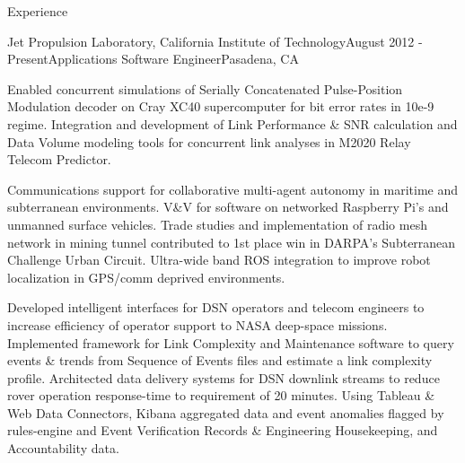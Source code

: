 \documentclass{resume} %
\begin{document}





\begin{rSection}{Experience}
\begin{rSubsection}{Jet Propulsion Laboratory, California Institute of Technology}{August 2012 - Present}{Applications Software Engineer}{Pasadena, CA}
\item Enabled concurrent simulations of Serially Concatenated Pulse-Position Modulation decoder on Cray XC40 supercomputer for bit error rates in 10e-9 regime. Integration and development of Link Performance \& SNR calculation and Data Volume modeling tools for concurrent link analyses in M2020 Relay Telecom Predictor.

\item Communications support for collaborative multi-agent autonomy in maritime and subterranean environments. V\&V for  software on networked Raspberry Pi's and unmanned surface vehicles.  Trade studies and implementation of radio mesh network in mining tunnel contributed to 1st place win in DARPA's Subterranean Challenge Urban Circuit. Ultra-wide band ROS integration to improve robot localization in GPS/comm deprived environments.

\item Developed intelligent interfaces for DSN operators and telecom engineers to increase efficiency of operator support to NASA deep-space missions. Implemented framework for Link Complexity and Maintenance software to query events \& trends from Sequence of Events files and estimate a link complexity profile. Architected data delivery systems for DSN downlink streams to reduce rover operation response-time to requirement of 20 minutes. Using Tableau \& Web Data Connectors, Kibana aggregated data and event anomalies flagged by rules-engine and Event Verification Records \& Engineering Housekeeping, and Accountability data. 


\end{rSubsection}
\end{rSection}
\end{document}
